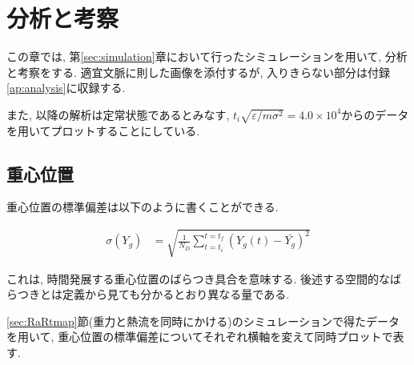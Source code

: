 \chapter{分析と考察}

この章では, 第\ref{sec:simulation}章において行ったシミュレーションを用いて, 分析と考察をする. 適宜文脈に則した画像を添付するが, 入りきらない部分は付録\ref{ap:analysis}に収録する.

また, 以降の解析は定常状態であるとみなす, $t_i \sqrt{\varepsilon / m \sigma^2} = 4.0 \times 10^{4}$からのデータを用いてプロットすることにしている.

\section{重心位置}


重心位置の標準偏差は以下のように書くことができる.

\begin{align}
  \sigma (Y_g) &= \sqrt{\frac{1}{N_{D}}\sum_{t=t_i}^{t=t_f} (Y_{g}(t) - \bar{Y_g})^2}
\end{align}

これは, 時間発展する重心位置のばらつき具合を意味する. 後述する空間的なばらつきとは定義から見ても分かるとおり異なる量である.

\ref{sec:RaRtmap}節(重力と熱流を同時にかける)のシミュレーションで得たデータを用いて, 重心位置の標準偏差についてそれぞれ横軸を変えて同時プロットで表す. 


